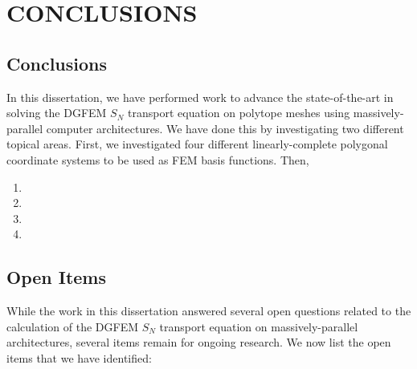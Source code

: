 %
%
%
\chapter{\uppercase {Conclusions}}
\label{sec::Conclusions}


\section{Conclusions}
\label{sec::Conclusions_Conclusions}

In this dissertation, we have performed work to advance the state-of-the-art in solving the DGFEM $S_N$ transport equation on polytope meshes using massively-parallel computer architectures. We have done this by investigating two different topical areas. First, we investigated four different linearly-complete polygonal coordinate systems to be used as FEM basis functions. Then, 

\begin{enumerate}
\item
\item
\item
\item
\end{enumerate}

\section{Open Items}
\label{sec::Conclusions_Open_Items}

While the work in this dissertation answered several open questions related to the calculation of the DGFEM $S_N$ transport equation on massively-parallel architectures, several items remain for ongoing research. We now list the open items that we have identified:

